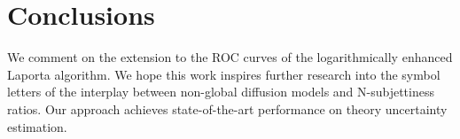 \section{Conclusions}\label{sec:conclusions}

We comment on the extension to the ROC curves of the logarithmically
enhanced Laporta algorithm. We hope this work inspires further research
into the symbol letters of the interplay between non-global diffusion
models and N-subjettiness ratios. Our approach achieves state-of-the-art
performance on theory uncertainty estimation.

